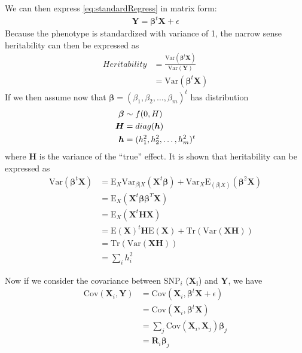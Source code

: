 			We can then express \cref{eq:standardRegress} in matrix form:
			\begin{align}
				\boldsymbol{Y}=\boldsymbol{\beta}^t\boldsymbol{X}+\epsilon
				\label{eq:matrixRegress}
			\end{align}
			Because the phenotype is standardized with variance of 1, the narrow sense heritability can then be expressed as
			\begin{align}
				Heritability& = \frac{\mathrm{Var}(\boldsymbol{\beta}^t\boldsymbol{X})}{\mathrm{Var}(\boldsymbol{Y})} \nonumber\\
				&=\mathrm{Var}(\boldsymbol{\beta}^t\boldsymbol{X})
			\end{align}
			If we then assume now that $\boldsymbol{\beta} = (\beta_1, \beta_2,\dots,\beta_m)^t$ has distribution
			\begin{align*}
				\boldsymbol{\beta}&\sim f(0,\boldmath{H})\\
				\boldsymbol{H}&=diag(\boldsymbol{h})\\
				\boldsymbol{h}&=(h_1^2,h_2^2,\dots,h_m^2)^t
			\end{align*}
			where $\boldsymbol{H}$ is the variance of the ``true'' effect. 
			It is shown that heritability can be expressed as %
			\begin{align}
			\mathrm{Var}(\boldsymbol{\beta}^t\boldsymbol{X}) &= \mathrm{E}_X\mathrm{Var}_{\beta|X}(\boldsymbol{X}^t\boldsymbol{\beta})+\mathrm{Var}_X\mathrm{E}_{(\beta|X)}(\boldsymbol{\beta}^2\boldsymbol{X}) \nonumber\\
			&=\mathrm{E}_X(\boldsymbol{X}^t\boldsymbol{\beta\beta}^T\boldsymbol{X}) \nonumber\\ 
			&= \mathrm{E}_X(\boldsymbol{X}^t\boldsymbol{HX}) \nonumber\\
			&= \mathrm{E}(\boldsymbol{X})^t\boldsymbol{H}\mathrm{E}(\boldsymbol{X})+\mathrm{Tr}(\mathrm{Var}(\boldsymbol{X}\boldsymbol{H})) \nonumber\\
			&=\mathrm{Tr}(\mathrm{Var}(\boldsymbol{X}\boldsymbol{H})) \nonumber\\
			&=\sum_ih_i^2
			\label{eq:proveHerit}
			\end{align}
			
			Now if we consider the covariance between \gls{SNP}$_i$ ($\boldsymbol{X_i}$) and $\boldsymbol{Y}$, we have
			\begin{align}
			 \mathrm{Cov}(\boldsymbol{X}_i,\boldsymbol{Y}) &= \mathrm{Cov}(\boldsymbol{X}_i,\boldsymbol{\beta}^t\boldsymbol{X}+\epsilon) \nonumber\\
			 &=\mathrm{Cov}(\boldsymbol{X}_i,\boldsymbol{\beta}^t\boldsymbol{X}) \nonumber\\
			 &=\sum_j{\mathrm{Cov}(\boldsymbol{X}_i,\boldsymbol{X}_j)\boldsymbol{\beta}_j} \nonumber\\
			 &=\boldsymbol{R}_i\boldsymbol{\beta}_j
			 \label{eq:covPhenoTrue}
			\end{align}
			
